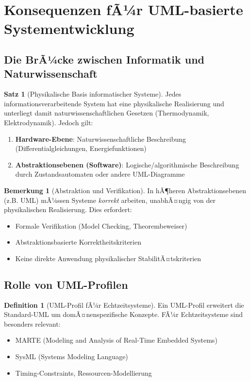 ﻿\documentclass[a4paper,12pt]{report}
\theoremstyle{definition}
\newtheorem{definition}{Definition}[section]
\newtheorem{bemerkung}{Bemerkung}[section]
\newtheorem{satz}{Satz}[section]
\begin{document}
\section{Konsequenzen fÃ¼r UML-basierte Systementwicklung}

\subsection{Die BrÃ¼cke zwischen Informatik und Naturwissenschaft}

\begin{satz}[Physikalische Basis informatischer Systeme]
	Jedes informationsverarbeitende System hat eine physikalische Realisierung und unterliegt damit naturwissenschaftlichen Gesetzen (Thermodynamik, Elektrodynamik). Jedoch gilt:
	\begin{enumerate}
		\item[-] \textbf{Hardware-Ebene}: Naturwissenschaftliche Beschreibung (Differentialgleichungen, Energiefunktionen)
		\item[-] \textbf{Abstraktionsebenen (Software)}: Logische/algorithmische Beschreibung durch Zu\-stands\-automaten oder andere UML-Diagramme
	\end{enumerate}
\end{satz}

\begin{bemerkung}[Abstraktion und Verifikation]
	In hÃ¶heren Abstraktionsebenen (z.B. UML) mÃ¼ssen Systeme \textit{korrekt} arbeiten, unabhÃ¤ngig von der physikalischen Realisierung. Dies erfordert:
	\begin{itemize}
		\item[-] Formale Verifikation (Model Checking, Theorembeweiser)
		\item[-] Abstraktionsbasierte Korrektheitskriterien
		\item[-] Keine direkte Anwendung physikalischer StabilitÃ¤tskriterien
	\end{itemize}
\end{bemerkung}

\subsection{Rolle von UML-Profilen}

\begin{definition}[UML-Profil fÃ¼r Echtzeitsysteme]
	Ein UML-Profil erweitert die Standard-UML um domÃ¤nenspezifische Konzepte. FÃ¼r Echtzeitsysteme sind besonders relevant:
	\begin{itemize}
		\item[-] MARTE (Modeling and Analysis of Real-Time Embedded Systems)
		\item[-] SysML (Systems Modeling Language)
		\item[-] Timing-Constraints, Ressourcen-Modellierung
	\end{itemize}
\end{definition}
\end{document}
